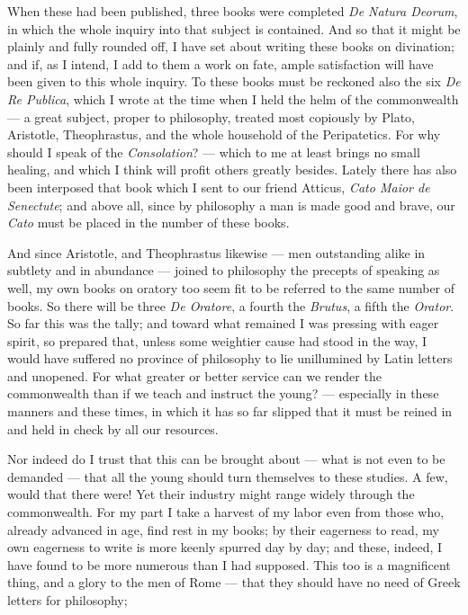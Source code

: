  When these had been published, three books were completed \textit{De Natura Deorum}, in which the whole inquiry into that subject is contained. And so that it might be plainly and fully rounded off, I have set about writing these books on divination; and if, as I intend, I add to them a work on fate, ample satisfaction will have been given to this whole inquiry. To these books must be reckoned also the six \textit{De Re Publica}, which I wrote at the time when I held the helm of the commonwealth — a great subject, proper to philosophy, treated most copiously by Plato, Aristotle, Theophrastus, and the whole household of the Peripatetics. For why should I speak of the \textit{Consolation}? — which to me at least brings no small healing, and which I think will profit others greatly besides. Lately there has also been interposed that book which I sent to our friend Atticus, \textit{Cato Maior de Senectute}; and above all, since by philosophy a man is made good and brave, our \textit{Cato} must be placed in the number of these books.

 And since Aristotle, and Theophrastus likewise — men outstanding alike in subtlety and in abundance — joined to philosophy the precepts of speaking as well, my own books on oratory too seem fit to be referred to the same number of books. So there will be three \textit{De Oratore}, a fourth the \textit{Brutus}, a fifth the \textit{Orator}. So far this was the tally; and toward what remained I was pressing with eager spirit, so prepared that, unless some weightier cause had stood in the way, I would have suffered no province of philosophy to lie unillumined by Latin letters and unopened. For what greater or better service can we render the commonwealth than if we teach and instruct the young? — especially in these manners and these times, in which it has so far slipped that it must be reined in and held in check by all our resources.

 Nor indeed do I trust that this can be brought about — what is not even to be demanded — that all the young should turn themselves to these studies. A few, would that there were! Yet their industry might range widely through the commonwealth. For my part I take a harvest of my labor even from those who, already advanced in age, find rest in my books; by their eagerness to read, my own eagerness to write is more keenly spurred day by day; and these, indeed, I have found to be more numerous than I had supposed. This too is a magnificent thing, and a glory to the men of Rome — that they should have no need of Greek letters for philosophy;

